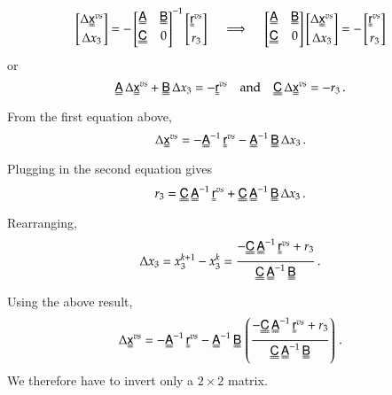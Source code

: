 \documentclass[twoside,10pt,a4paper]{article}
\begin{document}
\[
  \begin{bmatrix} \Delta\Mx^{vs} \\ \Delta x_3 \end{bmatrix} 
   = - \begin{bmatrix} \MAmat & \MBmat \\ \MCmat & 0 \end{bmatrix}^{-1} 
                    \begin{bmatrix} \Mr^{vs} \\ r_3 \end{bmatrix} 
  \quad \implies \quad 
   \begin{bmatrix} \MAmat & \MBmat \\ \MCmat & 0 \end{bmatrix} 
  \begin{bmatrix} \Delta\Mx^{vs} \\ \Delta x_3 \end{bmatrix}  = 
                    -\begin{bmatrix} \Mr^{vs} \\ r_3 \end{bmatrix} 
\]
or
\[
   \MAmat\,\Delta\Mx^{vs} + \MBmat\,\Delta x_3 = -\Mr^{vs} \quad \Tand \quad
   \MCmat\,\Delta\Mx^{vs} = -r_3 \,.
\]
From the first equation above,
\[
  \Delta\Mx^{vs} = -\MAmat^{-1}\,\Mr^{vs} - \MAmat^{-1}\,\MBmat\,\Delta x_3 \,.
\]
Plugging in the second equation gives
\[
   r_3 = \MCmat\,\MAmat^{-1}\,\Mr^{vs} + \MCmat\,\MAmat^{-1}\,\MBmat\,\Delta x_3 \,.
\]
Rearranging,
\[
  \Delta x_3 = x_3^{k+1} - x_3^k = \frac{-\MCmat\,\MAmat^{-1}\,\Mr^{vs} + r_3}{\MCmat\,\MAmat^{-1}\,\MBmat} \,.
\]
Using the above result,
\[
  \Delta\Mx^{vs} = -\MAmat^{-1}\,\Mr^{vs} - \MAmat^{-1}\,\MBmat\,\left(\frac{-\MCmat\,\MAmat^{-1}\,\Mr^{vs} + r_3}{\MCmat\,\MAmat^{-1}\,\MBmat}\right) \,.
\]
We therefore have to invert only a $2 \times 2 $ matrix.
\end{document}
